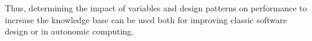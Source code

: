 Thus, determining the impact of variables and design patterns on performance to increase the knowledge base can be used both for improving classic software design or in autonomic computing.






